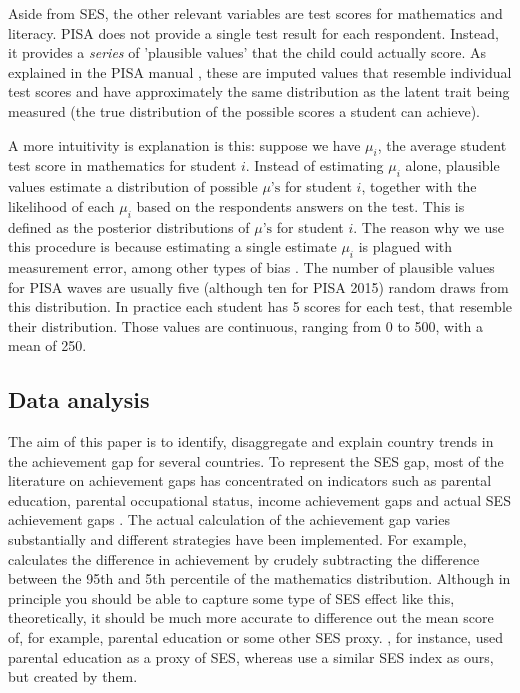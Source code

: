 \documentclass[11pt, a4paper]{article}\usepackage[]{graphicx}\usepackage[]{color}
\begin{document}
Aside from SES, the other relevant variables are test scores for mathematics and literacy. PISA does not provide a single test result for each respondent. Instead, it provides a \emph{series} of 'plausible values' that the child could actually score. As explained in the PISA manual \citep{pisa2012_technical}, these are imputed values that resemble individual test scores and have approximately the same distribution as the latent trait being measured (the true distribution of the possible scores a student can achieve). 

A more intuitivity is explanation is this: suppose we have \(\mu_i\), the average student test score in mathematics for student \(i\). Instead of estimating \(\mu_i\) alone, plausible values estimate a distribution of possible \(\mu\text{'s}\) for student \(i\), together with the likelihood of each \(\mu_i\) based on the respondents answers on the test. This is defined as the posterior distributions of \(\mu\text{'s}\) for student \(i\). The reason why we use this procedure is because estimating a single estimate \(\mu_i\) is plagued with measurement error, among other types of bias \citep[see][]{wu2005}. The number of plausible values for PISA waves are usually five (although ten for PISA 2015) random draws from this distribution. In practice each student has 5 scores for each test, that resemble their distribution. Those values are continuous, ranging from 0 to 500, with a mean of 250.

\subsection{Data analysis}

The aim of this paper is to identify, disaggregate and explain country trends in the achievement gap for several countries. To represent the SES gap, most of the literature on achievement gaps has concentrated on indicators such as parental education, parental occupational status, income achievement gaps and actual SES achievement gaps \citep{fryer2004, hanushek_woesmann_tracking, saw2016, bradbury2015, byun2010}. The actual calculation of the achievement gap varies substantially and different strategies have been implemented. For example, \citet{micklewright} calculates the difference in achievement by crudely subtracting the difference between the 95th and 5th percentile of the mathematics distribution. Although in principle you should be able to capture some type of SES effect like this, theoretically, it should be much more accurate to difference out the mean score of, for example, parental education or some other SES proxy. \citet{saw2016}, for instance, used parental education as a proxy of SES, whereas \citet{byun2010} use a similar SES index as ours, but created by them.
\end{document}
